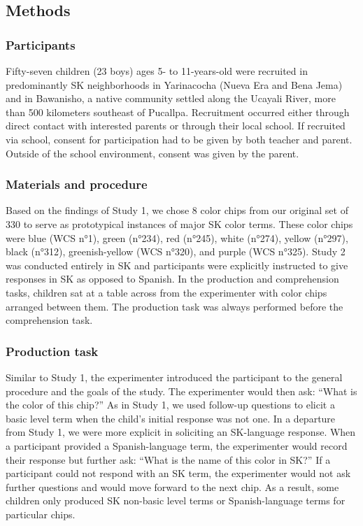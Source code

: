 \documentclass[
  english,
  ,apa7,floatsintext]{apa6}
\begin{document}
\hypertarget{methods-1}{%
\subsection{Methods}\label{methods-1}}

\hypertarget{participants-1}{%
\subsubsection{Participants}\label{participants-1}}

Fifty-seven children (23 boys) ages 5- to 11-years-old were recruited in predominantly SK neighborhoods in Yarinacocha (Nueva Era and Bena Jema) and in Bawanisho, a native community settled along the Ucayali River, more than 500 kilometers southeast of Pucallpa. Recruitment occurred either through direct contact with interested parents or through their local school. If recruited via school, consent for participation had to be given by both teacher and parent. Outside of the school environment, consent was given by the parent.

\hypertarget{materials-and-procedure-1}{%
\subsubsection{Materials and procedure}\label{materials-and-procedure-1}}

Based on the findings of Study 1, we chose 8 color chips from our original set of 330 to serve as prototypical instances of major SK color terms. These color chips were blue (WCS n°1), green (n°234), red (n°245), white (n°274), yellow (n°297), black (n°312), greenish-yellow (WCS n°320), and purple (WCS n°325). Study 2 was conducted entirely in SK and participants were explicitly instructed to give responses in SK as opposed to Spanish. In the production and comprehension tasks, children sat at a table across from the experimenter with color chips arranged between them. The production task was always performed before the comprehension task.

\hypertarget{production-task}{%
\subsubsection{Production task}\label{production-task}}

Similar to Study 1, the experimenter introduced the participant to the general procedure and the goals of the study. The experimenter would then ask: ``What is the color of this chip?'' As in Study 1, we used follow-up questions to elicit a basic level term when the child's initial response was not one. In a departure from Study 1, we were more explicit in soliciting an SK-language response. When a participant provided a Spanish-language term, the experimenter would record their response but further ask: ``What is the name of this color in SK?'' If a participant could not respond with an SK term, the experimenter would not ask further questions and would move forward to the next chip. As a result, some children only produced SK non-basic level terms or Spanish-language terms for particular chips.
\end{document}
